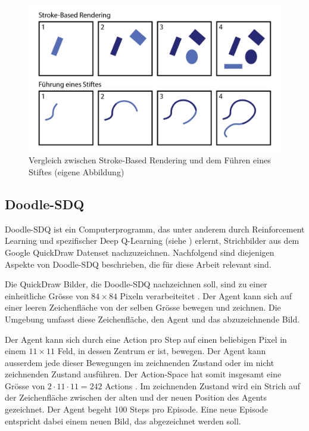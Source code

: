 \begin{figure}[!ht]
    \centering
    \includegraphics[width=\textwidth]{images/theorie/stroke-v-stift.png}
    \caption{Vergleich zwischen Stroke-Based Rendering und dem Führen eines Stiftes (eigene Abbildung)}
    \label{fig:stroke-v-stift}
\end{figure}

\subsection{Doodle-SDQ}\label{sub:t_ver_dood} Doodle-SDQ ist ein
Computerprogramm, das unter anderem durch Reinforcement Learning und
spezifischer Deep Q-Learning (siehe ) erlernt,
Strichbilder aus dem Google QuickDraw Datenset \cite{noauthor_quick_2022}
nachzuzeichnen. Nachfolgend sind diejenigen Aspekte von Doodle-SDQ beschrieben,
die für diese Arbeit relevant sind.

Die QuickDraw Bilder, die Doodle-SDQ nachzeichnen soll, sind zu einer
einheitliche Grösse von $84\times84$ Pixeln verarbeiteitet \cite[S.
7]{zhou_learning_2018}. Der Agent kann sich auf einer leeren Zeichenfläche von
der selben Grösse bewegen und zeichnen. Die Umgebung umfasst diese
Zeichenfläche, den Agent und das abzuzeichnende Bild.

Der Agent kann sich durch eine Action pro Step auf einen beliebigen Pixel in
einem $11\times11$ Feld, in dessen Zentrum er ist, bewegen. Der Agent kann
ausserdem jede dieser Bewegungen im zeichnenden Zustand oder im nicht
zeichnenden Zustand ausführen. Der Action-Space hat somit insgesamt eine Grösse
von $2\cdot11\cdot11 = 242$ Actions \cite[S. 5]{zhou_learning_2018}. Im
zeichnenden Zustand wird ein Strich auf der Zeichenfläche zwischen der alten und
der neuen Position des Agents gezeichnet. Der Agent begeht 100 Steps pro
Episode. Eine neue Episode entspricht dabei einem neuen Bild, das abgezeichnet
werden soll.

